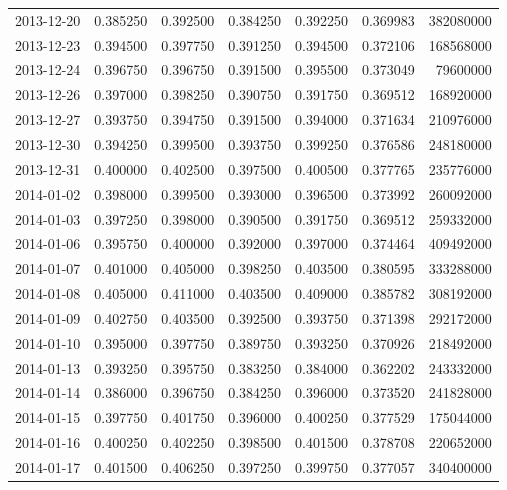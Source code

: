 \begin{tabular}{lrrrrrr}
2013-12-20 &    0.385250 &    0.392500 &    0.384250 &    0.392250 &    0.369983 &   382080000 \\
2013-12-23 &    0.394500 &    0.397750 &    0.391250 &    0.394500 &    0.372106 &   168568000 \\
2013-12-24 &    0.396750 &    0.396750 &    0.391500 &    0.395500 &    0.373049 &    79600000 \\
2013-12-26 &    0.397000 &    0.398250 &    0.390750 &    0.391750 &    0.369512 &   168920000 \\
2013-12-27 &    0.393750 &    0.394750 &    0.391500 &    0.394000 &    0.371634 &   210976000 \\
2013-12-30 &    0.394250 &    0.399500 &    0.393750 &    0.399250 &    0.376586 &   248180000 \\
2013-12-31 &    0.400000 &    0.402500 &    0.397500 &    0.400500 &    0.377765 &   235776000 \\
2014-01-02 &    0.398000 &    0.399500 &    0.393000 &    0.396500 &    0.373992 &   260092000 \\
2014-01-03 &    0.397250 &    0.398000 &    0.390500 &    0.391750 &    0.369512 &   259332000 \\
2014-01-06 &    0.395750 &    0.400000 &    0.392000 &    0.397000 &    0.374464 &   409492000 \\
2014-01-07 &    0.401000 &    0.405000 &    0.398250 &    0.403500 &    0.380595 &   333288000 \\
2014-01-08 &    0.405000 &    0.411000 &    0.403500 &    0.409000 &    0.385782 &   308192000 \\
2014-01-09 &    0.402750 &    0.403500 &    0.392500 &    0.393750 &    0.371398 &   292172000 \\
2014-01-10 &    0.395000 &    0.397750 &    0.389750 &    0.393250 &    0.370926 &   218492000 \\
2014-01-13 &    0.393250 &    0.395750 &    0.383250 &    0.384000 &    0.362202 &   243332000 \\
2014-01-14 &    0.386000 &    0.396750 &    0.384250 &    0.396000 &    0.373520 &   241828000 \\
2014-01-15 &    0.397750 &    0.401750 &    0.396000 &    0.400250 &    0.377529 &   175044000 \\
2014-01-16 &    0.400250 &    0.402250 &    0.398500 &    0.401500 &    0.378708 &   220652000 \\
2014-01-17 &    0.401500 &    0.406250 &    0.397250 &    0.399750 &    0.377057 &   340400000 \\

\end{tabular}

